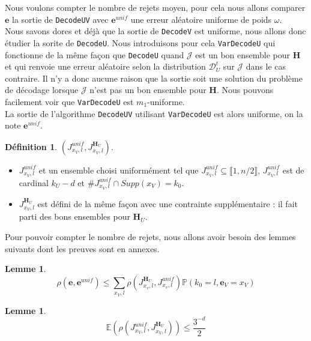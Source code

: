 \documentclass[12pt]{article}
\theoremstyle{definition}
\newtheorem{lemme}[thm]{Lemme}
\newtheorem{defi}[thm]{Définition}
\newcommand{\e}{\mathbf{e}}
\newcommand{\J}{\mathcal{J}}
\newcommand{\D}{\mathcal{D}}
\begin{document}
Nous voulons compter le nombre de rejets moyen, pour cela nous allons comparer $\e$ la sortie de \verb|DecodeUV| avec $\e^{unif}$ une erreur aléatoire uniforme de poids $\omega$.\\
Nous savons dores et déjà que la sortie de \verb|DecodeV| est uniforme, nous allons donc étudier la sorite de \verb|DecodeU|.
Nous introduisons pour cela \verb|VarDecodeU| qui fonctionne de la même façon que \verb|DecodeU| quand $\J$ est un bon ensemble pour $\mathbf{H}$ et qui renvoie une erreur aléatoire selon la distribution $\D_U^t$ sur $\J$ dans le cas contraire.
Il n'y a donc aucune raison que la sortie soit une solution du problème de décodage lorsque $\J$ n'est pas un bon ensemble pour $\mathbf{H}$.
Nous pouvons facilement voir que \verb|VarDecodeU| est $m_1$-uniforme.\\
La sortie de l'algorithme \verb|DecodeUV| utilisant \verb|VarDecodeU| est alors uniforme, on la note $\e^{unif}$.\\

\begin{defi} $(J_{x_V,l}^{unif},J_{x_V, l}^{\mathbf{H}_U})$.\\
\begin{itemize}
\item $J_{x_V,l}^{unif}$ et un ensemble choisi uniformément tel que $J_{x_V,l}^{unif}\subseteq \llbracket 1,n/2 \rrbracket$, $J_{x_V,l}^{unif}$ est de cardinal $k_U-d$ et $\#J_{x_V,l}^{unif}\cap Supp(x_V) = k_0$. 
\item $J_{x_V, l}^{\mathbf{H}_U}$ est défini de la même façon avec une contrainte supplémentaire : il fait parti des bons ensembles pour $\mathbf{H}_U$.
\end{itemize}
\end{defi}

Pour pouvoir compter le nombre de rejets, nous allons avoir besoin des lemmes suivants dont les preuves sont en annexes.

\begin{lemme}\label{maj_dist_e_eunif}
$$ \rho\left(\e ,\e^{unif}\right) \leq \sum\limits_{x_V,l} \rho\left(J_{x_v,l}^{\mathbf{H}_U},J_{x_v,l}^{unif}\right)\mathbb{P}\left(k_0 = l, \e_V = x_V\right) $$ 
\end{lemme}


\begin{lemme}
\begin{equation}\label{esp}
\mathbb{E}\left(\rho\left(J_{x_V,l}^{unif},J_{x_V, l}^{\mathbf{H}_U}\right)\right) \leq \frac{3^{-d}}{2}
\end{equation}

\end{lemme}
\end{document}
